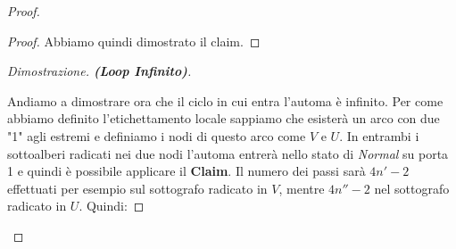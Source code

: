 \begin{proof}
\begin{proof}



        Abbiamo quindi dimostrato il claim.
    \end{proof}

    \begin{proof}[Dimostrazione. \textbf{(Loop Infinito)}]\

        Andiamo a dimostrare ora che il ciclo in cui entra l'automa è infinito.
        Per come abbiamo definito l'etichettamento locale sappiamo che esisterà
        un arco con due "1" agli estremi e definiamo i nodi di questo arco come
        $V$ e $U$. In entrambi i sottoalberi radicati nei due nodi l'automa
        entrerà nello stato di \textit{Normal} su porta 1 e quindi è possibile
        applicare il \textbf{Claim}. Il numero dei passi sarà $4n' - 2$
        effettuati per esempio sul sottografo radicato in $V$, mentre $4n''-2$ nel
        sottografo radicato in $U$. Quindi:


\end{proof}
\end{proof}
